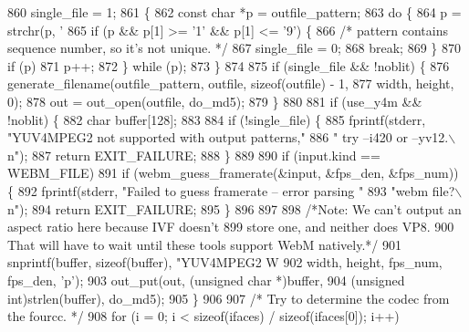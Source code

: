 \begin{DoxyCodeInclude}
{{{{{{{{{{{{{{{{{{{{{{{{{{860   single\_file = 1;
861   \{
862     \textcolor{keyword}{const} \textcolor{keywordtype}{char} *p = outfile\_pattern;
863     \textcolor{keywordflow}{do} \{
864       p = strchr(p, \textcolor{charliteral}{'%
865       \textcolor{keywordflow}{if} (p && p[1] >= \textcolor{charliteral}{'1'} && p[1] <= \textcolor{charliteral}{'9'}) \{
866         \textcolor{comment}{/* pattern contains sequence number, so it's not unique. */}
867         single\_file = 0;
868         \textcolor{keywordflow}{break};
869       \}
870       \textcolor{keywordflow}{if} (p)
871         p++;
872     \} \textcolor{keywordflow}{while} (p);
873   \}
874 
875   \textcolor{keywordflow}{if} (single\_file && !noblit) \{
876     generate\_filename(outfile\_pattern, outfile, \textcolor{keyword}{sizeof}(outfile) - 1,
877                       width, height, 0);
878     out = out\_open(outfile, do\_md5);
879   \}
880 
881   \textcolor{keywordflow}{if} (use\_y4m && !noblit) \{
882     \textcolor{keywordtype}{char} buffer[128];
883 
884     \textcolor{keywordflow}{if} (!single\_file) \{
885       fprintf(stderr, \textcolor{stringliteral}{"YUV4MPEG2 not supported with output patterns,"}
886               \textcolor{stringliteral}{" try --i420 or --yv12.\(\backslash\)n"});
887       \textcolor{keywordflow}{return} EXIT\_FAILURE;
888     \}
889 
890     \textcolor{keywordflow}{if} (input.kind == WEBM\_FILE)
891       \textcolor{keywordflow}{if} (webm\_guess\_framerate(&input, &fps\_den, &fps\_num)) \{
892         fprintf(stderr, \textcolor{stringliteral}{"Failed to guess framerate -- error parsing "}
893                 \textcolor{stringliteral}{"webm file?\(\backslash\)n"});
894         \textcolor{keywordflow}{return} EXIT\_FAILURE;
895       \}
896 
897 
898     \textcolor{comment}{/*Note: We can't output an aspect ratio here because IVF doesn't}
899 \textcolor{comment}{       store one, and neither does VP8.}
900 \textcolor{comment}{      That will have to wait until these tools support WebM natively.*/}
901     snprintf(buffer, \textcolor{keyword}{sizeof}(buffer), \textcolor{stringliteral}{"YUV4MPEG2 W%
902              width, height, fps\_num, fps\_den, \textcolor{charliteral}{'p'});
903     out\_put(out, (\textcolor{keywordtype}{unsigned} \textcolor{keywordtype}{char} *)buffer,
904             (\textcolor{keywordtype}{unsigned} \textcolor{keywordtype}{int})strlen(buffer), do\_md5);
905   \}
906 
907   \textcolor{comment}{/* Try to determine the codec from the fourcc. */}
908   \textcolor{keywordflow}{for} (i = 0; i < \textcolor{keyword}{sizeof}(ifaces) / \textcolor{keyword}{sizeof}(ifaces[0]); i++)
}}}}}}}}}}}}}}}}}}}}}}}}}}}}
\end{DoxyCodeInclude}
